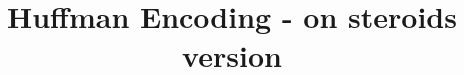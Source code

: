 \documentclass[12pt]{article}
\begin{document}
\title{Huffman Encoding - on steroids version}
\maketitle
\end{document}
